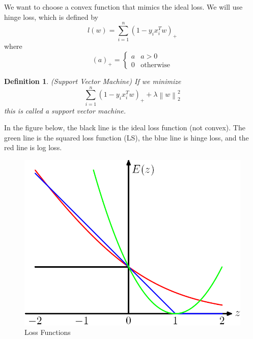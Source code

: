 \documentclass[12pt]{article}
\newtheorem{definition}{Definition}
\theoremstyle{definition}
\newcommand{\norm}[1]{\left\lVert#1\right\rVert}
\begin{document}
We want to choose a convex function that mimics the ideal loss. We will use hinge loss, which is defined by
\begin{equation}
	l(w) = \sum_{i=1}^n (1 - y_i x_i^T w)_+
\end{equation}
where
\begin{equation}
	(a)_+ = \begin{cases}
	a & a > 0 \\
	0 & \text{otherwise}
	\end{cases}
\end{equation}

\begin{definition}(Support Vector Machine)
	If we minimize
	\begin{equation}
		\sum_{i=1}^n (1 - y_i x_i^T w)_+ + \lambda\norm{w}^2_2
	\end{equation}
	this is called a support vector machine.
\end{definition}

In the figure below, the black line is the ideal loss function (not convex). The green line is the squared loss function (LS), the blue line is hinge loss, and the red line is log loss. 
\begin{figure}[H]
	\begin{center}
		\includegraphics[scale=.4]{loss_func.png}
	\end{center}
	\caption{Loss Functions}
\end{figure}
\end{document}
